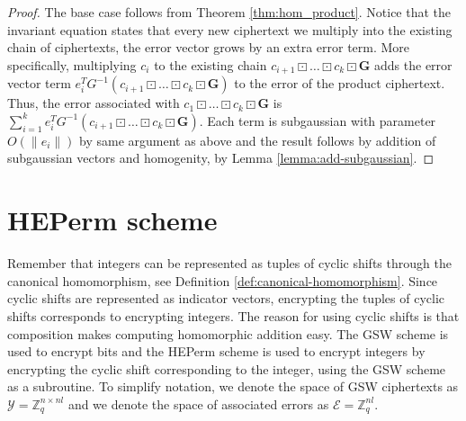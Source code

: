 \begin{proof}
    The base case follows from Theorem \ref{thm:hom_product}.
    Notice that the invariant equation states that every new ciphertext we multiply into the existing chain of ciphertexts, the error vector grows by an extra error term. More specifically, multiplying $c_i$ to the existing chain $c_{i+1} \boxdot \dots \boxdot c_k \boxdot \mathbf{G}$ adds the error vector term $e_i^TG^{-1}(c_{i+1} \boxdot \dots \boxdot c_k \boxdot \mathbf{G})$ to the error of the product ciphertext. Thus, the error associated with $c_1 \boxdot \dots \boxdot c_k \boxdot \mathbf{G}$ is $\sum_{i = 1}^k e_i^TG^{-1}(c_{i+1} \boxdot  \dots \boxdot c_k \boxdot \mathbf{G})$. Each term is subgaussian with parameter $O(\|e_i\|)$ by same argument as above and the result follows by addition of subgaussian vectors and homogenity, by Lemma \ref{lemma:add-subgaussian}.
\end{proof}

\section{HEPerm scheme}
Remember that integers can be represented as tuples of cyclic shifts through the canonical homomorphism, see Definition \ref{def:canonical-homomorphism}. Since cyclic shifts are represented as indicator vectors, encrypting the tuples of cyclic shifts corresponds to encrypting integers. The reason for using cyclic shifts is that composition makes computing homomorphic addition easy. The GSW scheme is used to encrypt bits and the HEPerm scheme is used to encrypt integers by encrypting the cyclic shift corresponding to the integer, using the GSW scheme as a subroutine. To simplify notation, we denote the space of GSW ciphertexts as $\mathcal{Y} = \mathbb{Z}_q^{n \times nl}$ and we denote the space of associated errors as $\mathcal{E} = \mathbb{Z}_q^{nl}$.

